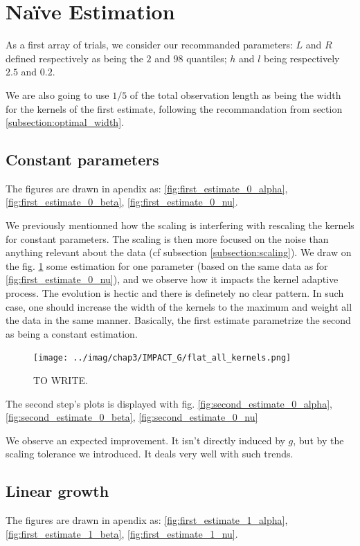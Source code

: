 \documentclass[11pt]{book}
\begin{document}
\section{Naïve Estimation}
As a first array of trials, we consider our recommanded parameters: $L$ and $R$ defined respectively as being the $2$ and $98$ quantiles; $h$ and $l$ being respectively $2.5$ and $0.2$. 

We are also going to use $1/5$ of the total observation length as being the width for the kernels of the first estimate, following the recommandation from section \ref{subsection:optimal_width}. 

\subsection{Constant parameters}
The figures are drawn in apendix as: \ref{fig:first_estimate_0_alpha}, \ref{fig:first_estimate_0_beta}, \ref{fig:first_estimate_0_nu}. 


We previously mentionned how the scaling is interfering with rescaling the kernels for constant parameters. The scaling is then more focused on the noise than anything relevant about the data (cf subsection \ref{subsection:scaling}). We draw on the fig. \ref{fig:impact_g_flat} some estimation for one parameter (based on the same data as for \ref{fig:first_estimate_0_nu}), and we observe how it impacts the kernel adaptive process. The evolution is hectic and there is definetely no clear pattern. In such case, one should increase the width of the kernels to the maximum and weight all the data in the same manner. Basically, the first estimate parametrize the second as being a constant estimation. 

\begin{figure}
\centering
\texttt{[image: ../imag/chap3/IMPACT\_G/flat\_all\_kernels.png]}
\caption{TO WRITE.}
\label{fig:impact_g_flat}
\end{figure}

The second step's plots is displayed with fig. \ref{fig:second_estimate_0_alpha}, \ref{fig:second_estimate_0_beta}, \ref{fig:second_estimate_0_nu}

We observe an expected improvement. It isn't directly induced by $g$, but by the scaling tolerance we introduced. It deals very well with such trends.

\subsection{Linear growth}
The figures are drawn in apendix as: \ref{fig:first_estimate_1_alpha}, \ref{fig:first_estimate_1_beta}, \ref{fig:first_estimate_1_nu}.
\end{document}
